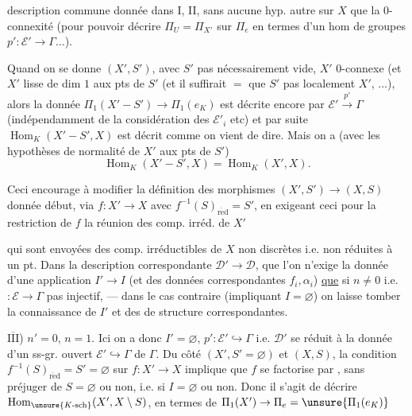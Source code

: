 description commune donnée dans I, II, sans aucune hyp. autre sur $X$ que  la $0$-connexité (pour pouvoir décrire $\Pi_U=\Pi_{X'}$ sur $\Pi_e$ en termes d'un hom de groupes $p':\mathcal E'\longrightarrow\Gamma\ldots$).

Quand on se donne $(X',S')$, avec $S'$ pas nécessairement vide, $X'$ $0$-connexe (et  $X'$ lisse de dim $1$ aux pts de $S'$ (et il suffirait $=$ que $S'$   pas localement  $X'$, $\ldots$),
alors la  donnée
$\Pi_1(X'-S')\longrightarrow\Pi_1(e_K)$ est décrite encore par $\mathcal E'\xrightarrow{p'}\Gamma$ (indépendamment de la considération des $\mathcal E'_i$ etc) et par suite $\operatorname{Hom}_K(X'-S',X)$ est décrit comme on vient de dire.
Mais on a (avec les hypothèses de normalité de $X'$ aux pts de $S'$)
\[
\operatorname{Hom}_K(X'-S',X)=\operatorname{Hom}_K(X',X).
\]

Ceci encourage à modifier la définition des morphismes $(X',S')\longrightarrow(X,S)$ donnée  début, via $f:X'\longrightarrow X$ avec $f^{-1}(S)_{\mathrm{r\acute ed}}=S'$, en exigeant ceci   pour la restriction de $f$  la réunion des comp. irréd. de $X'$

qui sont envoyées  des comp. irréductibles de $X$  non discrètes i.e. non réduites à un pt.
Dans la description correspondante $\mathcal D'\to\mathcal D$,  que l'on n'exige la donnée d'une application $I'\to I$ (et des données correspondantes $f_i,\alpha_i$) \uline{que} si  $n\ne0$ i.e. $:\mathcal E\to\Gamma$ pas injectif, --- dans le cas contraire (impliquant $I=\varnothing$)  on laisse tomber la connaissance de $I'$ et des  de structure correspondantes.

\uline{$\overline{\mathrm{III}}$}) $n'=0$, $n=1$. Ici on a donc $I'=\varnothing$, $p':\mathcal E'\hookrightarrow\Gamma$ i.e. $\mathcal D'$ se réduit à la donnée d'un ss-gr. ouvert $\mathcal E'\hookrightarrow\Gamma$ de $\Gamma$.
Du côté $(X',S'=\varnothing)$ et $(X,S)$, la condition $f^{-1}(S)_{\mathrm{r\acute ed}}=S'=\varnothing$ sur  $f:X'\to X$ implique que $f$ se factorise par , sans préjuger de $S=\varnothing$ ou non, i.e. si $I=\varnothing$ ou non. Donc il s'agit de décrire $\operatorname{Hom}_{\unsure{K\text{-sch}}}(X',X\setminus S)$, en termes de  $\Pi_1(X')\to\Pi_e=\unsure{\Pi_1(e_K)}$


